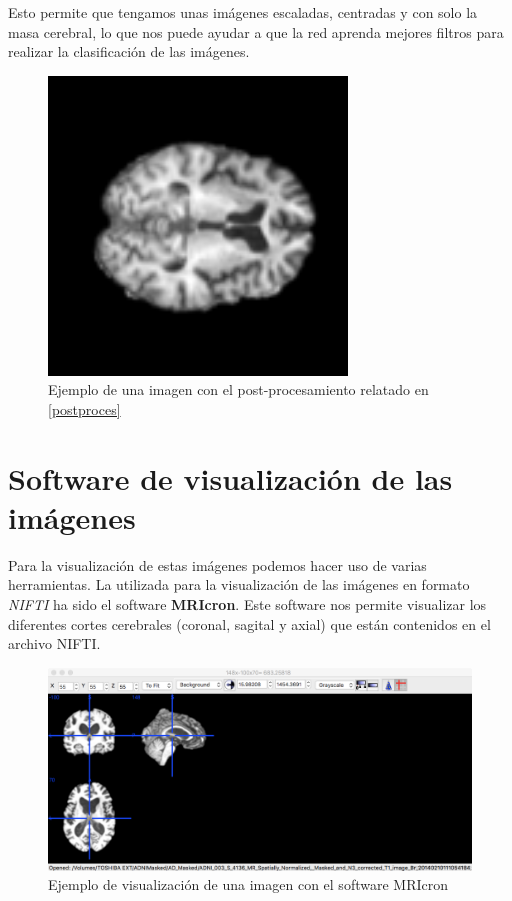 Esto permite que tengamos unas imágenes escaladas, centradas y con solo la masa cerebral, lo que nos puede ayudar a que la red aprenda mejores filtros para realizar la clasificación de las imágenes.\\
\begin{figure}[H]
	\centering
	\caption{Ejemplo de una imagen con el post-procesamiento relatado en \ref{postproces}}
	\includegraphics[height=300px,width=300px]{./imagenes/ejemplo_imagen.png}
\end{figure}

\section{Software de visualización de las imágenes}

Para la visualización de estas imágenes podemos hacer uso de varias herramientas. La utilizada para la visualización de las imágenes en formato \textit{NIFTI} ha sido el software \textbf{MRIcron}\cite{mricron}. Este software nos permite visualizar los diferentes cortes cerebrales (coronal, sagital y axial) que están contenidos en el archivo NIFTI.\\

\begin{figure}[H]
	\centering
	\caption{Ejemplo de visualización de una imagen con el software MRIcron \cite{mricron}}
	\includegraphics[width=\textwidth]{./imagenes/ejemplomricron.png}
\end{figure}


